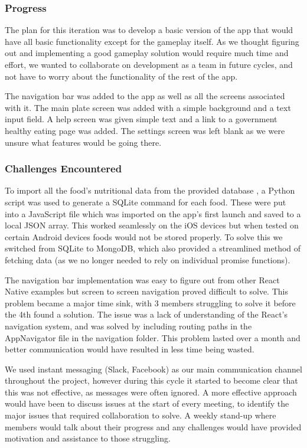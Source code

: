 \documentclass{l3proj}
\begin{document}
\subsubsection{Progress}
The plan for this iteration was to develop a basic version of the app that would have all basic functionality except for the gameplay itself. As we thought figuring out and implementing a good gameplay solution would require much time and effort, we wanted to collaborate on development as a team in future cycles, and not have to worry about the functionality of the rest of the app.

The navigation bar was added to the app as well as all the screens associated with it. The main plate screen was added with a simple background and a text input field. A help screen was given simple text and a link to a government healthy eating page was added. The settings screen was left blank as we were unsure what features would be going there.

\subsubsection{Challenges Encountered}
To import all the food's nutritional data from the provided database \cite{mccancewiddowson}, a Python script was used to generate a SQLite command for each food. These were put into a JavaScript file which was imported on the app's first launch and saved to a local JSON array. This worked seamlessly on the iOS devices but when tested on certain Android devices foods would not be stored properly. To solve this we switched from SQLite to MongoDB, which also provided a streamlined method of fetching data (as we no longer needed to rely on individual promise functions). 

The navigation bar implementation was easy to figure out from other React Native examples but screen to screen navigation proved difficult to solve. This problem became a major time sink, with 3 members struggling to solve it before the 4th found a solution. The issue was a lack of understanding of the React's navigation system, and was solved by including routing paths in the AppNavigator file in the navigation folder. This problem lasted over a month and better communication would have resulted in less time being wasted.

We used instant messaging (Slack, Facebook) as our main communication channel throughout the project, however during this cycle it started to become clear that this was not effective, as messages were often ignored. A more effective approach would have been to discuss issues at the start of every meeting, to identify the major issues that required collaboration to solve. A weekly stand-up \cite{standup} where members would talk about their progress and any challenges would have provided motivation and assistance to those struggling.
\end{document}
